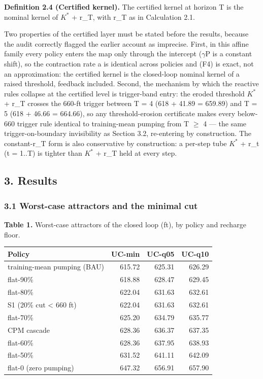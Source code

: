 \textbf{Definition 2.4 (Certified kernel).} The certified kernel at
horizon T is the nominal kernel of \(K^{\ast}\) + r\_T, with r\_T as in
Calculation 2.1.

Two properties of the certified layer must be stated before the results,
because the audit correctly flagged the earlier account as imprecise.
First, in this affine family every policy enters the map only through
the intercept (\ensuremath{\gamma}P is a constant shift), so the contraction rate a is
identical across policies and (F4) is exact, not an approximation: the
certified kernel is the closed-loop nominal kernel of a raised
threshold, feedback included. Second, the mechanism by which the
reactive rules collapse at the certified level is trigger-band entry:
the eroded threshold \(K^{\ast}\) + r\_T crosses the 660-ft trigger
between T = 4 (618 + 41.89 = 659.89) and T = 5 (618 + 46.66 = 664.66),
so any threshold-erosion certificate makes every below-660 trigger rule
identical to training-mean pumping from T \ensuremath{\geq} 4 --- the same
trigger-on-boundary invisibility as Section 3.2, re-entering by
construction. The constant-r\_T form is also conservative by
construction: a per-step tube \(K^{\ast}\) + r\_t (t = 1..T) is tighter
than \(K^{\ast}\) + r\_T held at every step.

\subsection{3. Results}\label{edw-results}

\subsubsection{3.1 Worst-case attractors and the minimal
cut}\label{edw-worst-case-attractors-and-the-minimal-cut}

\textbf{Table 1.} Worst-case attractors of the closed loop (ft), by
policy and recharge floor.

\begin{longtable}[]{@{}lrrr@{}}
\toprule\noalign{}
Policy & UC-min & UC-q05 & UC-q10 \\
\midrule\noalign{}
\endhead
\bottomrule\noalign{}
\endlastfoot
training-mean pumping (BAU) & 615.72 & 625.31 & 626.29 \\
flat-90\% & 618.88 & 628.47 & 629.45 \\
flat-80\% & 622.04 & 631.63 & 632.61 \\
S1 (20\% cut \textless{} 660 ft) & 622.04 & 631.63 & 632.61 \\
flat-70\% & 625.20 & 634.79 & 635.77 \\
CPM cascade & 628.36 & 636.37 & 637.35 \\
flat-60\% & 628.36 & 637.95 & 638.93 \\
flat-50\% & 631.52 & 641.11 & 642.09 \\
flat-0 (zero pumping) & 647.32 & 656.91 & 657.90 \\
\end{longtable}

